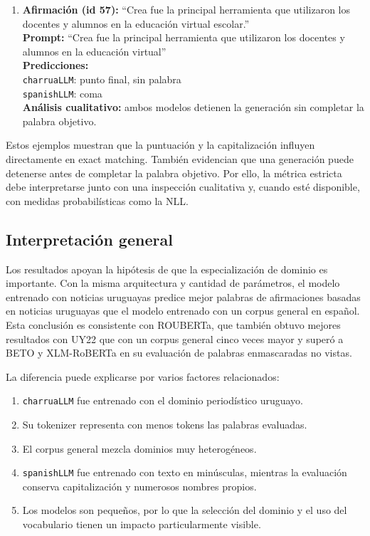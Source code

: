 \documentclass[11pt,a4paper]{article}
\newcommand{\charrua}{\texttt{charruaLLM}}
\newcommand{\spanishmodel}{\texttt{spanishLLM}}
\begin{document}
\begin{enumerate}[leftmargin=*, itemsep=0.9em]
    \item \textbf{Afirmación (id 57):} ``Crea fue la principal herramienta que
          utilizaron los docentes y alumnos en la educación virtual escolar.''\\
          \textbf{Prompt:} ``Crea fue la principal herramienta que utilizaron los
          docentes y alumnos en la educación virtual''\\
          \textbf{Predicciones:}\\
          \hspace*{1em}\charrua{}: punto final, sin palabra\\
          \hspace*{1em}\spanishmodel{}: coma\\
          \textbf{Análisis cualitativo:} ambos modelos detienen la generación sin
          completar la palabra objetivo.
\end{enumerate}

Estos ejemplos muestran que la puntuación y la capitalización influyen
directamente en exact matching. También evidencian que una generación puede
detenerse antes de completar la palabra objetivo. Por ello, la métrica estricta
debe interpretarse junto con una inspección cualitativa y, cuando esté disponible,
con medidas probabilísticas como la NLL.


\subsection{Interpretación general}

Los resultados apoyan la hipótesis de que la especialización de dominio es
importante. Con la misma arquitectura y cantidad de parámetros, el modelo
entrenado con noticias uruguayas predice mejor palabras de afirmaciones basadas
en noticias uruguayas que el modelo entrenado con un corpus general en español.
Esta conclusión es consistente con ROUBERTa, que también obtuvo mejores
resultados con UY22 que con un corpus general cinco veces mayor y superó a BETO
y XLM-RoBERTa en su evaluación de palabras enmascaradas no vistas.

La diferencia puede explicarse por varios factores relacionados:

\begin{enumerate}
    \item \charrua{} fue entrenado con el dominio periodístico uruguayo.
    \item Su tokenizer representa con menos tokens las palabras evaluadas.
    \item El corpus general mezcla dominios muy heterogéneos.
    \item \spanishmodel{} fue entrenado con texto en minúsculas, mientras la
          evaluación conserva capitalización y numerosos nombres propios.
    \item Los modelos son pequeños, por lo que la selección del dominio y el
          uso del vocabulario tienen un impacto particularmente visible.
\end{enumerate}
\end{document}
